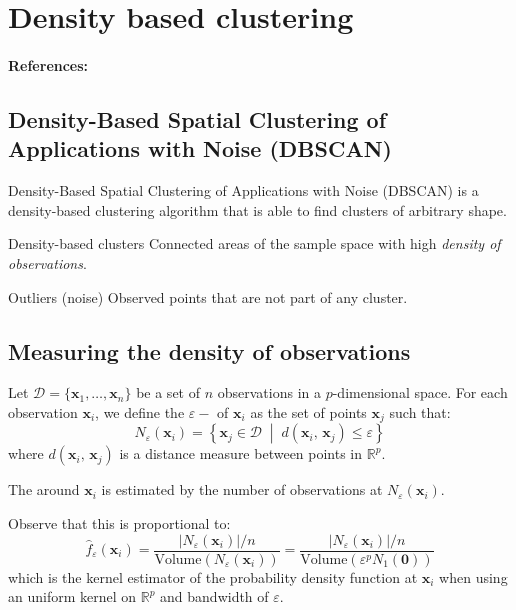 \clearpage
\section{Density based clustering}
\paragraph{References:} \cite{ester_density-based_1996}
\subsection{Density-Based Spatial Clustering of Applications with Noise (DBSCAN)}

Density-Based Spatial Clustering of Applications with Noise (DBSCAN) is
a density-based clustering algorithm that is able to find clusters of
arbitrary shape.

\begin{definition}{Density-based clusters}{}
	Connected areas of the sample space with high \emph{density of observations}.
\end{definition}

\begin{definition}{Outliers (noise)}{}
	Observed points that are not part of any cluster.
\end{definition}

\subsection{Measuring the density of observations}
Let $\mathcal{D} = \{ \boldsymbol{x}_1, \ldots, \boldsymbol{x}_n \}$ be a set of $n$ observations
in a $p$-dimensional space. For each observation $\boldsymbol{x}_i$, we define the $\varepsilon-$
of $\boldsymbol{x}_i$ as the set of points $\boldsymbol{x}_j$ such that:
\begin{equation*}
	N_{\varepsilon}(\boldsymbol{x}_i) = \left\{
	\boldsymbol{x}_j \in \mathcal{D} \;\middle|\; d(\boldsymbol{x}_i,\,\boldsymbol{x}_j) \leq \varepsilon
	\right\}
\end{equation*}
where $d(\boldsymbol{x}_i,\,\boldsymbol{x}_j)$ is a distance measure between points in $\mathds{R}^p$.

The  around $\boldsymbol{x}_i$ is estimated by the number
of observations at $N_{\varepsilon}(\boldsymbol{x}_i)$.

Observe that this is proportional to:
\begin{equation*}
	\hat{f}_\varepsilon(\boldsymbol{x}_i) =
	\frac{|N_{\varepsilon}(\boldsymbol{x}_i)| / n}{\text{Volume}(N_{\varepsilon}(\boldsymbol{x}_i))}
	= \frac{|N_{\varepsilon}(\boldsymbol{x}_i)| / n}{\text{Volume}(\varepsilon^p N_{1}(\boldsymbol{0}))}
\end{equation*}
which is the kernel estimator of the probability density function at $\boldsymbol{x}_i$
when using an uniform kernel on $\mathds{R}^p$ and bandwidth of $\varepsilon$.

